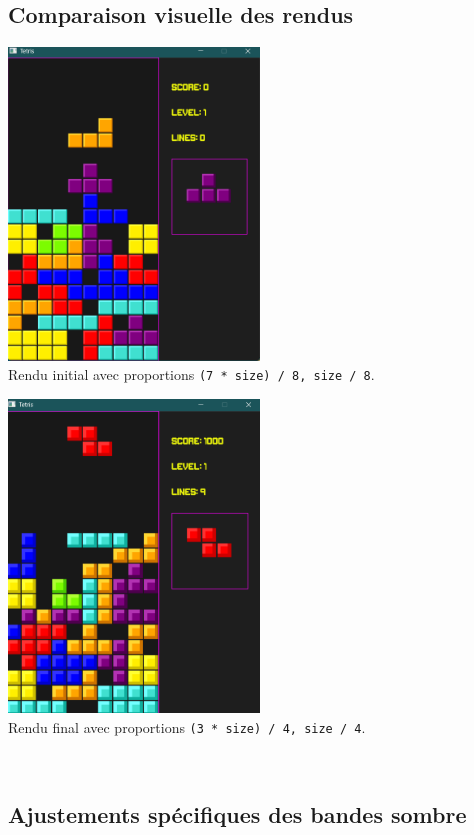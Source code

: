 \documentclass[12pt,a4paper]{report}
\begin{document}
\subsection{Comparaison visuelle des rendus}
\begin{center}
    \centering
    \includegraphics[width=0.5\textwidth]{Figure_1_Tetris.png}
    \\
    \caption{Rendu initial avec proportions \texttt{(7 * size) / 8, size / 8}.}
    \label{fig:figure1}
\end{center}

\begin{center}
    \centering
    \includegraphics[width=0.5\textwidth]{Figure_2_Tetris.png}
    \\
    \caption{Rendu final avec proportions \texttt{(3 * size) / 4, size / 4}.}
    \label{fig:figure2}
\end{center}
\\
\newpage
\subsection{Ajustements spécifiques des bandes sombre}
\end{document}
